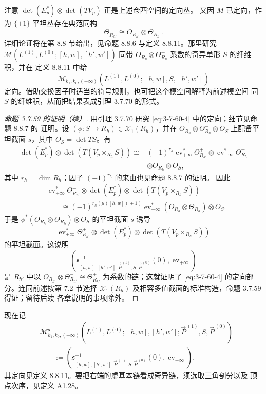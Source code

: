 注意 $\det(E_p^*)\otimes\det(TV_p)$ 正是上述仓西空间的定向丛。
又因 $M$ 已定向，作为 $\{\pm1\}$-平坦丛存在典范同构
\[
 \Theta^+_{R_{h'}}
 \cong O_{R_{h'}}\otimes\Theta^-_{R_{h'}}.
\]
详细论证将在第 8.8 节给出，见命题 8.8.6 与定义 8.8.11。那里研究
$\mathcal M(L^{(1)},L^{(0)};[h,w],[h',w'])$ 同带
$O_{R_h}\otimes\Theta^-_{R_h}$ 系数的奇异单形 $S$ 的纤维积，并在
定义 8.8.11 中给
\[
 \mathcal M_{k_1,k_0,(+\infty)}
 (L^{(1)},L^{(0)};[h,w],S,[h',w'])
\]
定向。借助交换因子时适当的符号规则，也可把这个模空间解释为前述模空间
同 $S$ 的纤维积，从而把结果表成引理 3.7.70 的形式。

\begin{proof}[命题 3.7.59 的证明（续）]
用引理 3.7.70 研究 \eqref{eq:3-7-60-4} 中的定向；细节见命题 8.8.7 的
证明。设
$(\phi\colon S\to R_h)\in\mathcal X_1(R_h)$，并在
$O_{R_h}\otimes\Theta^-_{R_h}\otimes O_S$ 上配备平坦截面
$s$，其中 $O_S=\det TS$。有
\[
\begin{aligned}
 \det(E_p^*)\otimes\det(T(V_p\times_{R_h}S))
 \cong{}&
 (-1)^{r_h}
 \operatorname{ev}_{+\infty}^*\Theta^+_{R_{h'}}
 \otimes\operatorname{ev}_{-\infty}^*\Theta^-_{R_h}\\
 &\otimes O_{R_h}\otimes O_S,
\end{aligned}
\]
其中 $r_h=\dim R_h$；因子 $(-1)^{r_h}$ 的来由也见命题 8.8.7 的证明。
因此
\[
\begin{aligned}
 &\operatorname{ev}_{+\infty}^*\Theta^+_{R_{h'}}
 \otimes\det(E_p^*)\otimes\det(T(V_p\times_{R_h}S))\\
 &\qquad\cong
 (-1)^{r_h(\mu([h,w])+1)}
 \operatorname{ev}_{-\infty}^*
 (O_{R_h}\otimes\Theta^-_{R_h})\otimes O_S.
\end{aligned}
\]
于是 $\phi^*(O_{R_h}\otimes\Theta^-_{R_h})\otimes O_S$ 的平坦截面 $s$
诱导
\[
 \operatorname{ev}_{+\infty}^*\Theta^+_{R_{h'}}
 \otimes\det(E_p^*)\otimes\det(T(V_p\times_{R_h}S))
\]
的平坦截面。这说明
\[
 \left(
 \mathfrak s_{[h,w],[h',w'],\vec P^{\,(1)},S,\vec P^{\,(0)}}^{-1}(0),
 \operatorname{ev}_{+\infty}
 \right)
\]
是 $R_{h'}$ 中以
$O_{R_{h'}}\otimes\Theta^-_{R_{h'}}
\cong\Theta^+_{R_{h'}}$ 为系数的链；这就证明了
\eqref{eq:3-7-60-4} 的定向部分。连同前述按第 7.2 节选择
$\mathcal X_1(R_h)$ 及相容多值截面的标准构造，命题 3.7.59 得证；留待后续
各章说明的事项除外。
\end{proof}

现在记
\[
\begin{aligned}
 &\mathcal M^{\mathfrak s}_{k_1,k_0,(+\infty)}
 (L^{(1)},L^{(0)};[h,w],[h',w'];
 \vec P^{\,(1)},S,\vec P^{\,(0)})\\
 &\qquad:=
 \left(
 \mathfrak s_{[h,w],[h',w'],\vec P^{\,(1)},S,\vec P^{\,(0)}}^{-1}(0),
 \operatorname{ev}_{+\infty}
 \right).
\end{aligned}
\]
其定向见定义 8.8.11。要把右端的虚基本链看成奇异链，须选取三角剖分以及
顶点次序，见定义 A1.28。

